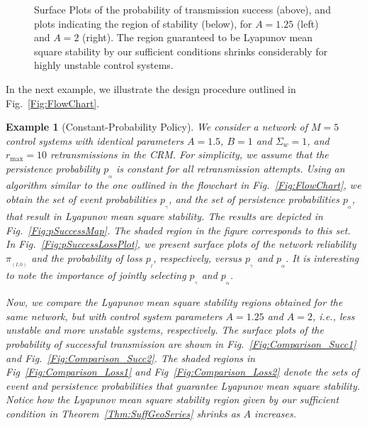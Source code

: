 \documentclass[twocolumn]{autart}
\newtheorem{example}{Example}[section]
\begin{document}
\begin{figure}[ptb]
\begin{center}
\caption{Surface Plots of the probability of transmission success (above), and plots indicating the region of stability (below), for $A = 1.25$ (left) and $A = 2$ (right). The region guaranteed to be Lyapunov mean square stability by our sufficient conditions shrinks considerably for highly unstable control systems.}
\end{center}
\end{figure}

In the next example, we illustrate the design procedure outlined in Fig.~\ref{Fig:FlowChart}.
\begin{example}[Constant-Probability Policy] \label{Ex:ConstLawDesign}
We consider a network of $M=5$ control systems with identical parameters $A = 1.5$, $B = 1$ and $\Sigma_w = 1$, and $r_{\max} = 10$ retransmissions in the CRM. For simplicity, we assume that the persistence probability $p_{_{\alpha}}$ is constant for all retransmission attempts. Using an algorithm similar to the one outlined in the flowchart in Fig.~\ref{Fig:FlowChart}, we obtain the set of event probabilities $p_{_{\gamma}}$, and the set of persistence probabilities $p_{_{\alpha}}$, that result in Lyapunov mean square stability. The results are depicted in Fig.~\ref{Fig:pSuccessMap}. The shaded region in the figure corresponds to this set. In Fig.~\ref{Fig:pSuccessLossPlot}, we present surface plots of the network reliability $\pi_{_{(I,0)}}$ and the probability of loss $p_{_{l}}$, respectively, versus $p_{_{\gamma}}$ and $p_{_{\alpha}}$. It is interesting to note the importance of jointly selecting $p_{_{\gamma}}$ and $p_{_{\alpha}}$.

Now, we compare the Lyapunov mean square stability regions obtained for the same network, but with control system parameters $A=1.25$ and $A=2$, i.e., less unstable and more unstable systems, respectively. The surface plots of the probability of successful transmission are shown in Fig.~\ref{Fig:Comparison_Succ1} and Fig.~\ref{Fig:Comparison_Succ2}. The shaded regions in Fig~\ref{Fig:Comparison_Loss1} and Fig~\ref{Fig:Comparison_Loss2} denote the sets of event and persistence probabilities that guarantee Lyapunov mean square stability. Notice how the Lyapunov mean square stability region given by our sufficient condition in Theorem~\ref{Thm:SuffGeoSeries} shrinks as $A$ increases.
\end{example}
\end{document}
